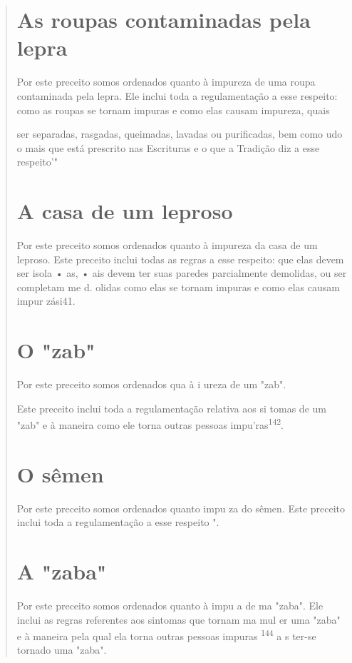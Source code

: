\begin{quote}


\section{As roupas contaminadas pela lepra}

Por este preceito somos ordenados quanto à impureza de uma rou­pa
contaminada pela lepra. Ele inclui toda a regulamentação a esse
respeito: co­mo as roupas se tornam impuras e como elas causam impureza,
quais

ser separadas, rasgadas, queimadas, lavadas ou purificadas, bem como udo
o mais que está prescrito nas Escrituras e o que a Tradição diz a esse
respeito'"

\section{A casa de um leproso}

Por este preceito somos ordenados quanto à impureza da casa de um
leproso. Este preceito inclui todas as regras a esse respeito: que elas
devem ser isola • as, • ais devem ter suas paredes parcialmente
demolidas, ou ser com­pletam me d. olidas como elas se
tornam impuras e como elas causam impur zási41.

\section{O "zab"}

Por este preceito somos ordenados qua à i ureza de um "zab".

Este preceito inclui toda a regulamentação relativa aos si tomas de um
"zab" e à maneira como ele torna outras pessoas
impu'ras\textsuperscript{142}.

\section{O sêmen}

Por este preceito somos ordenados quanto impu za do sêmen. Este preceito
inclui toda a regulamentação a esse respeito ".

\section{A "zaba"}

Por este preceito somos ordenados quanto à impu a de ma "za­ba". Ele
inclui as regras referentes aos sintomas que tornam ma mul er uma "zaba"
e à maneira pela qual ela torna outras pessoas impuras
\textsuperscript{144} a s ter-se tornado uma "zaba".


\end{quote}
